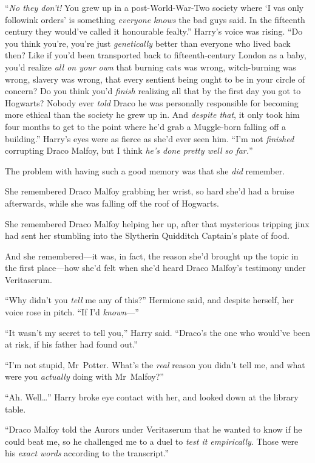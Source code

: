 “\emph{No they don’t!} You grew up in a post-World-War-Two society where ‘I vas only followink orders’ is something \emph{everyone knows} the bad guys said. In the fifteenth century they would’ve called it honourable fealty.” Harry’s voice was rising. “Do you think you’re, you’re just \emph{genetically} better than everyone who lived back then? Like if you’d been transported back to fifteenth-century London as a baby, you’d realize \emph{all on your own} that burning cats was wrong, witch-burning was wrong, slavery was wrong, that every sentient being ought to be in your circle of concern? Do you think you’d \emph{finish} realizing all that by the first day you got to Hogwarts? Nobody ever \emph{told} Draco he was personally responsible for becoming more ethical than the society he grew up in. And \emph{despite that}, it only took him four months to get to the point where he’d grab a Muggle-born falling off a building.” Harry’s eyes were as fierce as she’d ever seen him. “I’m not \emph{finished} corrupting Draco Malfoy, but I think \emph{he’s done pretty well so far.}”

The problem with having such a good memory was that she \emph{did} remember.

She remembered Draco Malfoy grabbing her wrist, so hard she’d had a bruise afterwards, while she was falling off the roof of Hogwarts.

She remembered Draco Malfoy helping her up, after that mysterious tripping jinx had sent her stumbling into the Slytherin Quidditch Captain’s plate of food.

And she remembered—it was, in fact, the reason she’d brought up the topic in the first place—how she’d felt when she’d heard Draco Malfoy’s testimony under Veritaserum.

“Why didn’t you \emph{tell} me any of this?” Hermione said, and despite herself, her voice rose in pitch. “If I’d \emph{known}—”

“It wasn’t my secret to tell you,” Harry said. “Draco’s the one who would’ve been at risk, if his father had found out.”

“I’m not stupid, Mr~Potter. What’s the \emph{real} reason you didn’t tell me, and what were you \emph{actually} doing with Mr~Malfoy?”

“Ah. Well…” Harry broke eye contact with her, and looked down at the library table.

“Draco Malfoy told the Aurors under Veritaserum that he wanted to know if he could beat me, so he challenged me to a duel to \emph{test it empirically}. Those were his \emph{exact words} according to the transcript.”


